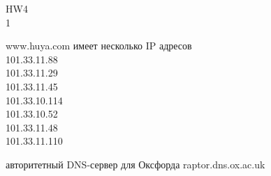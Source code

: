 \documentclass[a4paper,11pt]{article}
\begin{document}
\Large
HW4 \\
1
\begin{figure}[h]
\label{fig:image}
\end{figure}

www.huya.com имеет несколько IP адресов \\
101.33.11.88 \\
101.33.11.29 \\
101.33.11.45 \\
101.33.10.114 \\
101.33.10.52 \\
101.33.11.48 \\
101.33.11.110 \\

\begin{figure}[h]
\label{fig:image}
\end{figure}

авторитетный DNS-сервер для Оксфорда raptor.dns.ox.ac.uk

\begin{figure}[h]
\label{fig:image}
\end{figure}
\end{document}
